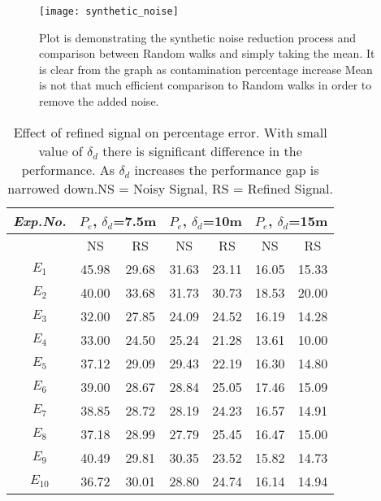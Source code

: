 \begin{figure}
\centering
\texttt{[image: synthetic\_noise]}
\caption{Plot is demonstrating the synthetic noise reduction process and comparison between Random walks and simply taking the mean. It is clear from the graph as contamination percentage increase Mean is not that much efficient comparison to Random walks in order to remove the added noise.
}
\label{fig:synthetic_noise}
\end{figure}

\begin{table}[h]
\centering
\caption{Effect of refined signal on percentage error. With small value 
of $\delta_d$ there is significant difference in the performance. As 
$\delta_d$ increases the performance gap is narrowed down.NS = Noisy Signal, RS = Refined Signal.}
	\begin{tabular}{|c|c|c|c|c|c|c|}
\hline
\textit{Exp.No.}& \multicolumn{2}{c}{$P_e$, $\delta_d$=7.5m} & \multicolumn{2}{c}{$P_e$, $\delta_d$=10m} & \multicolumn{2}{c|}{$P_e$, $\delta_d$=15m} \\ \hline
 ~  & NS  & RS & NS  & RS & NS  & RS \\ \hline
 $E_1$ & 45.98 & 29.68 & 31.63 & 23.11 &  16.05 & 15.33 \\ \hline
 $E_2$ & 40.00 & 33.68 & 31.73 & 30.73 &  18.53 & 20.00 \\ \hline
 $E_3$ & 32.00 & 27.85 & 24.09 & 24.52 &  16.19 & 14.28 \\ \hline
 $E_4$ & 33.00 & 24.50 & 25.24 & 21.28 &  13.61 & 10.00 \\ \hline
 $E_5$ & 37.12 & 29.09 & 29.43 & 22.19 &  16.30 & 14.80 \\ \hline
 $E_6$ & 39.00 & 28.67 & 28.84 & 25.05 &  17.46 & 15.09 \\ \hline
 $E_7$ & 38.85 & 28.72 & 28.19 & 24.23 &  16.57 & 14.91 \\ \hline
 $E_8$ & 37.18 & 28.99 & 27.79 & 25.45 &  16.47 & 15.00 \\ \hline
 $E_9$ & 40.49 & 29.81 & 30.35 & 23.52 &  15.82 & 14.73 \\ \hline
 $E_{10}$ & 36.72 & 30.01 & 28.80 & 24.74 &  16.14 & 14.94 \\ \hline
\end{tabular}
\label{table:localization_refined_signal}
\end{table} 

